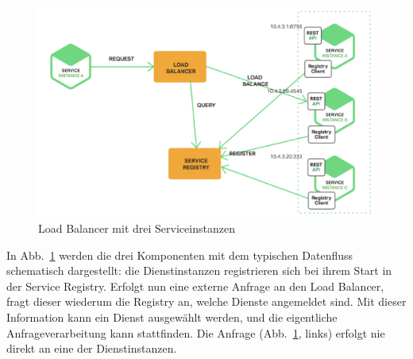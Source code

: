 \begin{figure}[t]
  \centering
  \includegraphics[width=\linewidth]{images/loadbalancer.png}
  \caption{Load Balancer mit drei Serviceinstanzen \cite{schoner2017analyse}}
    \label{fig:loadbalancer}
\end{figure}

In Abb.~\ref{fig:loadbalancer} werden die drei Komponenten mit dem typischen Datenfluss schematisch dargestellt: die Dienstinstanzen registrieren sich bei ihrem Start in der Service Registry. Erfolgt nun eine externe Anfrage an den Load Balancer, fragt dieser wiederum die Registry an, welche Dienste angemeldet sind. Mit dieser Information kann ein Dienst ausgewählt werden, und die eigentliche Anfrageverarbeitung kann stattfinden. Die Anfrage (Abb.~\ref{fig:loadbalancer}, links) erfolgt nie direkt an eine der Dienstinstanzen.
